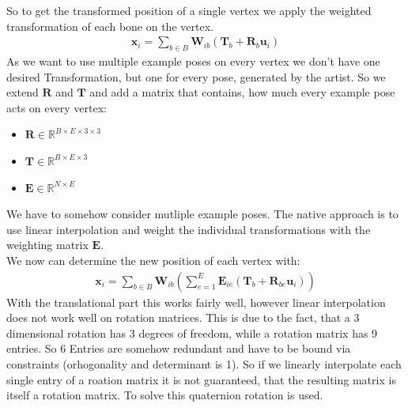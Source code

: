 So to get the transformed position of a single vertex we apply the weighted transformation of each bone on the vertex.
\begin{align}
\bm{x}_i =\sum_{b\in B} \bm{W}_{ib}\left(\bm{T}_b +\bm{R}_b \bm{u}_i\right)
\end{align}
As we want to use multiple example poses on every vertex we don't have one desired Transformation, but one for every pose, generated by the artist. So we extend $\bm{R}$ and $\bm{T}$ and add a matrix that contains, how much every example pose acts on every vertex:
\begin{itemize}
	\item $\bm {R}\in\mathbb{R}^{B\times E\times 3\times 3}$
	\item $\bm {T}\in \mathbb{R}^{B\times E\times 3}$
	\item $\bm{E}\in \mathbb{R}^{N \times E}$
\end{itemize}

We have to somehow consider mutliple example poses. The native approach is to use linear interpolation and weight the individual transformations with the weighting matrix $\bm{E}$.\\
We now can determine the new position of each vertex with:
\begin{align}
\bm{x}_i = \sum_{b\in B}\bm{W}_{ib}\left( \sum_{e=1}^{E} \bm{E}_{ie} \left( \bm{T}_b + \bm{R}_{be} \bm{u}_i \right) \right) 
\end{align}
With the translational part this works fairly well, however linear interpolation does not work well on rotation matrices. This is due to the fact, that a 3 dimensional rotation has 3 degrees of freedom, while a rotation matrix has 9 entries. So 6 Entries are somehow redundant and have to be bound via constraints (orhogonality and determinant is 1). So if we linearly interpolate each single entry of a roation matrix it is not guaranteed, that the resulting matrix is itself a rotation matrix. To solve this quaternion rotation is used.
